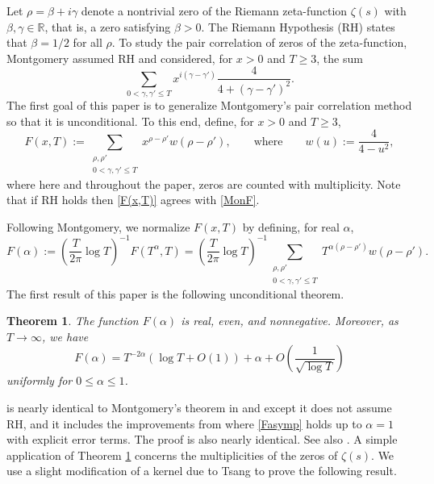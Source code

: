 \documentclass{amsart}
\newcommand{\1}{\mathbbm{1}}
\newtheorem{theorem}{Theorem}%
\theoremstyle{remark}
\numberwithin{equation}{section}
\begin{document}
Let $\rho=\beta +i\gamma$ denote a nontrivial zero of the Riemann zeta-function $\zeta(s)$ with $\beta,\gamma \in \mathbb{R}$, that is, a zero satisfying $\beta>0$. 
The Riemann Hypothesis (RH) states that $\beta=1/2$ for all $\rho$. To study the pair correlation of zeros of the zeta-function, Montgomery \cite{Montgomery73} assumed RH and considered, for $x>0$ and $T\ge3$, the sum
\begin{equation}\label{MonF} \sum_{ 0<\gamma,\gamma' \le T} x^{i(\gamma-\gamma')} \frac{4}{4+(\gamma-\gamma')^2}.
\end{equation}
The first goal of this paper is to generalize Montgomery's pair correlation method so that it is unconditional. To this end, define, for $x>0$ and $T\ge3$,
\begin{equation}\label{F(x,T)}
F(x,T) := \sum_{\substack{\rho, \rho' \\ 0<\gamma,\gamma' \le T}} x^{\rho-\rho'}w(\rho-\rho'), \qquad \text{where} \qquad w(u) := \frac{4}{4 - u^2},
\end{equation}
where here and throughout the paper, zeros are counted with multiplicity. Note that if RH holds then \eqref{F(x,T)} agrees with \eqref{MonF}.

Following Montgomery, we normalize $F(x,T)$ by defining, for real $\alpha$,
\begin{equation}\label{MonF(alpha)} F(\alpha) := \left(\frac{T}{2\pi}\log T\right)^{-1} F(T^\alpha,T) = \left(\frac{T}{2\pi}\log T\right)^{-1} \sum_{\substack{\rho, \rho' \\ 0<\gamma,\gamma' \le T}} T^{\alpha(\rho-\rho')}w(\rho-\rho').\end{equation}
The first result of this paper is the following unconditional theorem.
\begin{theorem}\label{thm1}
The function $F(\alpha)$ is real, even, and nonnegative. Moreover, as
$T \to \infty$, we have
\begin{equation}\label{Fasymp} F(\alpha) =
 T^{-2\alpha}(\log T + O(1))+ \alpha + O\left(\frac1{\sqrt{\log T}}\right) 
\end{equation}
uniformly for $0\le \alpha \le 1$.
\end{theorem}
 is nearly identical to Montgomery's theorem in \cite{Montgomery73} and \cite[Lemma 8]{GM87} except it does not assume RH, and it includes the improvements from \cite[Lemma 8]{GM87} where \eqref{Fasymp} holds up to $\alpha=1$ with explicit error terms. The proof is also nearly identical. See also \cite{IK04}. A simple application of Theorem \ref{thm1} concerns the multiplicities of the zeros of $\zeta(s)$. We use a slight modification of a kernel due to Tsang \cite{Tsang3} to prove the following result.
\end{document}
